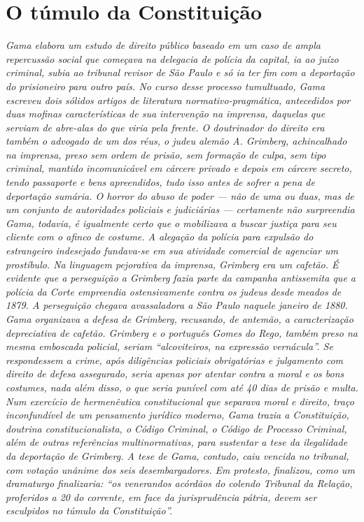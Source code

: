 \part{O túmulo da Constituição}

\begin{didas}
\emph{Gama elabora um estudo de direito público baseado em um caso de
ampla repercussão social que começava na delegacia de polícia da
capital, ia ao juízo criminal, subia ao tribunal revisor de São Paulo e
só ia ter fim com a deportação do prisioneiro para outro país. No curso
desse processo tumultuado, Gama escreveu dois sólidos artigos de
literatura normativo-pragmática, antecedidos por duas mofinas
características de sua intervenção na imprensa, daquelas que serviam de
abre-alas do que viria pela frente. O doutrinador do direito era também
o advogado de um dos réus, o judeu alemão A. Grimberg, achincalhado na
imprensa, preso sem ordem de prisão, sem formação de culpa, sem tipo
criminal, mantido incomunicável em cárcere privado e depois em cárcere
secreto, tendo passaporte e bens apreendidos, tudo isso antes de sofrer
a pena de deportação sumária. O horror do abuso de poder --- não de uma
ou duas, mas de um conjunto de autoridades policiais e judiciárias ---
certamente não surpreendia Gama, todavia, é igualmente certo que o
mobilizava a buscar justiça para seu cliente com o afinco de costume. A
alegação da polícia para expulsão do estrangeiro indesejado fundava-se
em sua atividade comercial de agenciar um prostíbulo. Na linguagem
pejorativa da imprensa, Grimberg era um cafetão. É evidente que a
perseguição a Grimberg fazia parte da campanha antissemita que a polícia
da Corte empreendia ostensivamente contra os judeus desde meados de
1879. A perseguição chegava avassaladora a São Paulo naquele janeiro de
1880. Gama organizava a defesa de Grimberg, recusando, de antemão, a
caracterização depreciativa de cafetão. Grimberg e o português Gomes do
Rego, também preso na mesma emboscada policial, seriam ``alcoviteiros, na
expressão vernácula''. Se respondessem a crime, após diligências
policiais obrigatórias e julgamento com direito de defesa assegurado,
seria apenas por atentar contra a moral e os bons costumes, nada além
disso, o que seria punível com até 40 dias de prisão e multa. Num
exercício de hermenêutica constitucional que separava moral e direito,
traço inconfundível de um pensamento jurídico moderno, Gama trazia a
Constituição, doutrina constitucionalista, o Código Criminal, o Código
de Processo Criminal, além de outras referências multinormativas, para
sustentar a tese da ilegalidade da deportação de Grimberg. A tese de
Gama, contudo, caiu vencida no tribunal, com votação unânime dos seis
desembargadores. Em protesto, finalizou, como um dramaturgo finalizaria:
``os venerandos acórdãos do colendo Tribunal da Relação, proferidos a 20
do corrente, em face da jurisprudência pátria, devem ser esculpidos no
túmulo da Constituição''. }
\end{didas}


